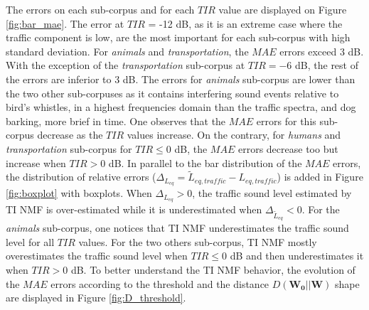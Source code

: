 \documentclass[12pt,english,twoside]{article}
\begin{document}
The errors on each sub-corpus and for each $TIR$ value are displayed on Figure \ref{fig:bar_mae}.
The error at $TIR$ = -12 dB, as it is an extreme case where the traffic component is low, are the most important for each sub-corpus with high standard deviation. For \textit{animals} and \textit{transportation}, the $MAE$ errors exceed 3 dB. With the exception of the \textit{transportation} sub-corpus at $TIR = -6$ dB, the rest of the errors are inferior to 3 dB.
The errors for \textit{animals} sub-corpus are lower than the two other sub-corpuses as it contains interfering sound events relative to bird's whistles, in a highest frequencies domain than the traffic spectra, and dog barking, more brief in time.
One observes that the $MAE$ errors for this sub-corpus decrease as the $TIR$ values increase. On the contrary, for \textit{humans} and \textit{transportation} sub-corpus for $TIR \leq 0$ dB, the $MAE$ errors decrease too but increase when $TIR > 0$ dB.
In parallel to the bar distribution of the $MAE$ errors, the distribution of relative errors ($\Delta_{L_{eq}} = \tilde{L}_{eq,traffic}-L_{eq,traffic}$) is added in Figure \ref{fig:boxplot} with boxplots. When $\Delta_{L_{eq}} > 0$, the traffic sound level estimated by TI NMF is over-estimated while it is underestimated when $\Delta_{\tilde{L}_{eq}} < 0$.
For the \textit{animals} sub-corpus, one notices that TI NMF underestimates the traffic sound level for all $TIR$ values. For the two others sub-corpus, TI NMF mostly  overestimates the traffic sound level when $TIR \leq 0$ dB and then underestimates it when $TIR > 0$ dB.
To better understand the TI NMF behavior, the evolution of the $MAE$ errors according to the threshold and the distance $D(\mathbf{W_0}\vert \vert \mathbf{W})$ shape are displayed in Figure \ref{fig:D_threshold}.
\end{document}
